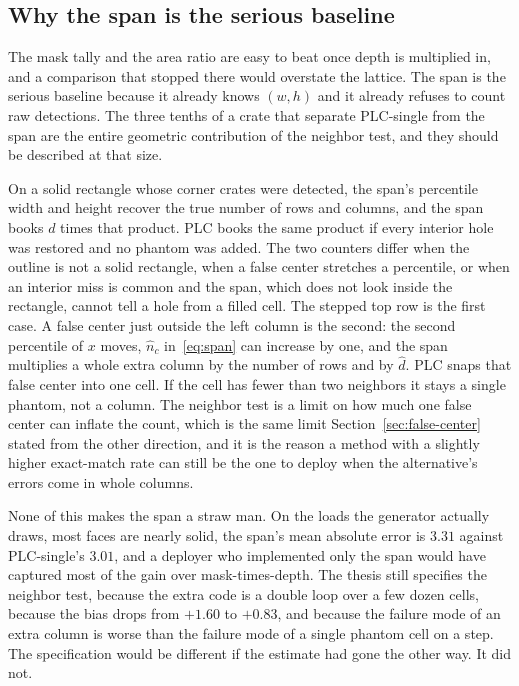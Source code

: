 \subsection{Why the span is the serious baseline}
\label{sec:span-serious}

The mask tally and the area ratio are easy to beat once depth is multiplied in, and a comparison that stopped there would overstate the lattice. The span is the serious baseline because it already knows $(w,h)$ and it already refuses to count raw detections. The three tenths of a crate that separate PLC-single from the span are the entire geometric contribution of the neighbor test, and they should be described at that size.

On a solid rectangle whose corner crates were detected, the span's percentile width and height recover the true number of rows and columns, and the span books $d$ times that product. PLC books the same product if every interior hole was restored and no phantom was added. The two counters differ when the outline is not a solid rectangle, when a false center stretches a percentile, or when an interior miss is common and the span, which does not look inside the rectangle, cannot tell a hole from a filled cell. The stepped top row is the first case. A false center just outside the left column is the second: the second percentile of $x$ moves, $\hat n_c$ in~\eqref{eq:span} can increase by one, and the span multiplies a whole extra column by the number of rows and by $\hat d$. PLC snaps that false center into one cell. If the cell has fewer than two neighbors it stays a single phantom, not a column. The neighbor test is a limit on how much one false center can inflate the count, which is the same limit Section~\ref{sec:false-center} stated from the other direction, and it is the reason a method with a slightly higher exact-match rate can still be the one to deploy when the alternative's errors come in whole columns.

None of this makes the span a straw man. On the loads the generator actually draws, most faces are nearly solid, the span's mean absolute error is $3.31$ against PLC-single's $3.01$, and a deployer who implemented only the span would have captured most of the gain over mask-times-depth. The thesis still specifies the neighbor test, because the extra code is a double loop over a few dozen cells, because the bias drops from $+1.60$ to $+0.83$, and because the failure mode of an extra column is worse than the failure mode of a single phantom cell on a step. The specification would be different if the estimate had gone the other way. It did not.

